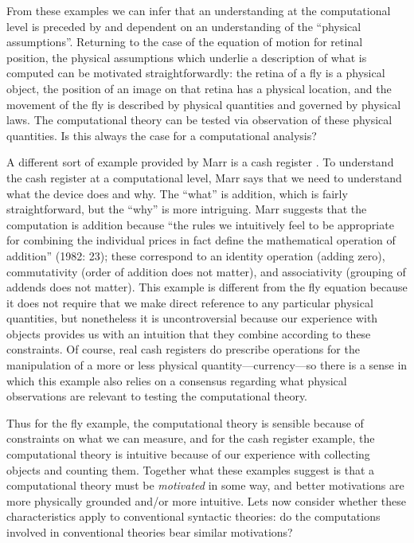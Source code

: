 From these examples we can infer that an understanding at the computational level is preceded by and dependent on an understanding of the “physical assumptions”. Returning to the case of the equation of motion for retinal position, the physical assumptions which underlie a description of what is computed can be motivated straightforwardly: the retina of a fly is a physical object, the position of an image on that retina has a physical location, and the movement of the fly is described by physical quantities and governed by physical laws. The computational theory can be tested via observation of these physical quantities. Is this always the case for a computational analysis?

A different sort of example provided by Marr is a cash register \citep{Marr1982}. To understand the cash register at a computational level, Marr says that we need to understand what the device does and why. The “what” is addition, which is fairly straightforward, but the “why” is more intriguing. Marr suggests that the computation is addition because “the rules we intuitively feel to be appropriate for combining the individual prices in fact define the mathematical operation of addition” (1982: 23); these correspond to an identity operation (adding zero), commutativity (order of addition does not matter), and associativity (grouping of addends does not matter). This example is different from the fly equation because it does not require that we make direct reference to any particular physical quantities, but nonetheless it is uncontroversial because our experience with objects provides us with an intuition that they combine according to these constraints. Of course, real cash registers do prescribe operations for the manipulation of a more or less physical quantity—currency—so there is a sense in which this example also relies on a consensus regarding what physical observations are relevant to testing the computational theory.

Thus for the fly example, the computational theory is sensible because of constraints on what we can measure, and for the cash register example, the computational theory is intuitive because of our experience with collecting objects and counting them. Together what these examples suggest is that a computational theory must be \textit{motivated} in some way, and better motivations are more physically grounded and/or more intuitive. Lets now consider whether these characteristics apply to conventional syntactic theories: do the computations involved in conventional theories bear similar motivations?

